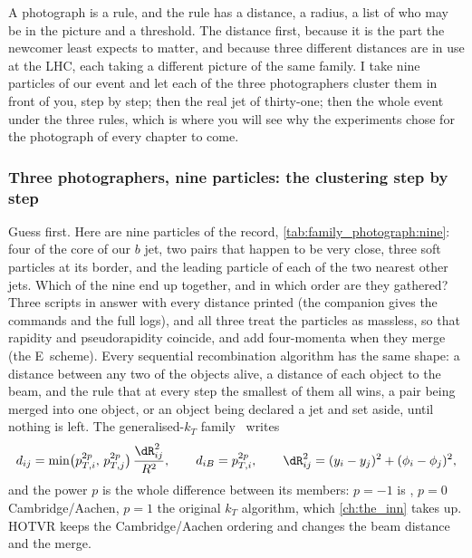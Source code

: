 A photograph is a rule, and the rule has a distance, a radius, a list of
who may be in the picture and a threshold. The distance first, because it
is the part the newcomer least expects to matter, and because three
different distances are in use at the LHC, each taking a different
picture of the same family. I take nine particles of our event and let
each of the three photographers cluster them in front of you, step by
step; then the real jet of thirty-one; then the whole event under the
three rules, which is where you will see why the experiments chose
\antikt for the photograph of every chapter to come.

\subsubsection{Three photographers, nine particles: the clustering step by step}
\label{sec:family_photograph:nine_particles}

Guess first. Here are nine particles of the record, \cref{tab:family_photograph:nine}:
four of the core of our $b$ jet, two pairs that happen to be very close,
three soft particles at its border, and the leading particle of each of
the two nearest other jets. Which of the nine end up together, and in
which order are they gathered? Three scripts in
 answer with every distance printed (the
companion gives the commands and the full logs), and all three treat the particles as massless, so that rapidity and
pseudorapidity coincide, and add four-momenta when they merge (the
E~scheme). Every sequential recombination algorithm has the same shape:
a distance \dij between any two of the objects alive, a distance \diB of
each object to the beam, and the rule that at every step the smallest of
them all wins, a pair being merged into one object, or an object being
declared a jet and set aside, until nothing is left. The generalised-$k_T$
family~\cite{Catani:1993hr,Ellis:1993tq,Dokshitzer:1997in,Wobisch:1998wt,Cacciari:2008gp}
writes
\begin{equation}
  \dij=\min\!\big(p_{T,i}^{2p},\,p_{T,j}^{2p}\big)\,\frac{\dR_{ij}^2}{R^2},\qquad
  \diB=p_{T,i}^{2p},\qquad
  \dR_{ij}^2=(y_i-y_j)^2+(\phi_i-\phi_j)^2,
  \label{eq:family_photograph:genkt}
\end{equation}
and the power $p$ is the whole difference between its members: $p=-1$ is
\antikt, $p=0$ Cambridge/Aachen, $p=1$ the original $k_T$ algorithm,
which \cref{ch:the_inn} takes up. HOTVR keeps the Cambridge/Aachen
ordering and changes the beam distance and the merge.

